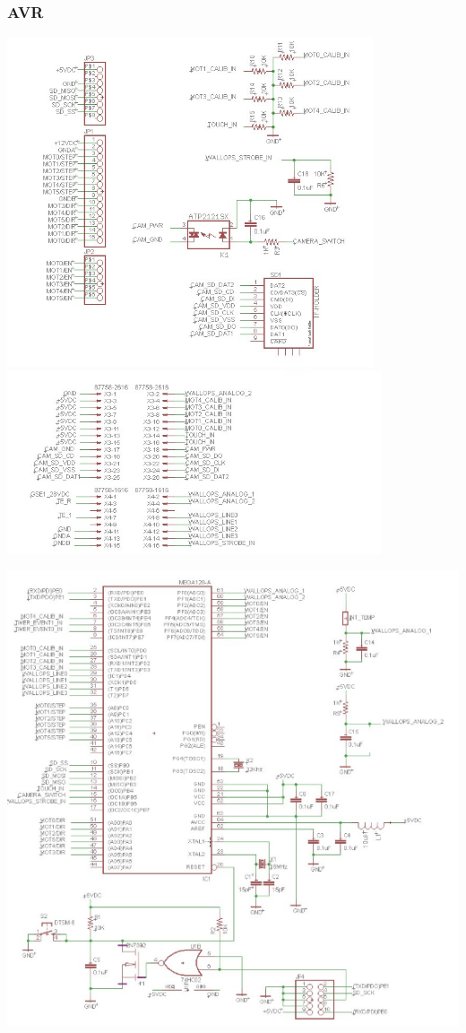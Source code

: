 \subsubsection{AVR}
\includegraphics[scale=.4]{./images/EESchems/AVR1}
\includegraphics[scale=.4]{./images/EESchems/AVR2}

\includegraphics[scale=.4]{./images/EESchems/AVR3}

